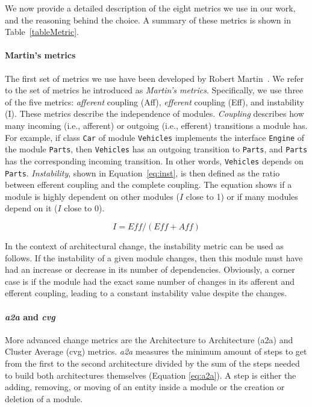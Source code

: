 \documentclass[sigplan, anonymous, review]{acmart}
\begin{document}
We now provide a detailed description of the eight metrics we use in our work, and the reasoning behind the choice.
A summary of these metrics is shown in Table~\ref{tableMetric}.


\paragraph{Martin's metrics} 
The first set of metrics we use have been developed by Robert Martin~\cite{martinsMetrics}.
We refer to the set of metrics he introduced as \textit{Martin's metrics}.
Specifically, we use three of the five metrics: \textit{afferent} coupling (Aff), \textit{efferent} coupling (Eff), and instability (I).
These metrics describe the independence of modules. 
\textit{Coupling} describes how many incoming (i.e., afferent) or outgoing (i.e., efferent) transitions a module has. 
For example, if class \texttt{Car} of module \texttt{Vehicles} implements the interface \texttt{Engine} of the module \texttt{Parts}, then \texttt{Vehicles} has an outgoing transition to \texttt{Parts}, and \texttt{Parts} has the corresponding incoming transition. 
In other words, \texttt{Vehicles} depends on \texttt{Parts}.
\textit{Instability}, shown in Equation~\ref{eq:inst}, is then defined as the ratio between efferent coupling and the complete coupling.
The equation shows if a module is highly dependent on other modules ($I$ close to 1) or if many modules depend on it ($I$ close to 0).

\begin{equation} \label{eq:inst}
I = \textit{Eff} / (\textit{Eff} + \textit{Aff})
\end{equation}

In the context of architectural change, the instability metric can be used as follows. If the instability of a given module changes, then this module must have had an increase or decrease in its number of dependencies. 
Obviously, a corner case is if the module had the exact same number of changes in its afferent and efferent coupling, leading to a constant instability value despite the changes.

\paragraph{\textit{a2a} and \textit{cvg}} More advanced change metrics are the Architecture to Architecture (a2a) and Cluster Average (cvg) metrics. 
\textit{a2a} measures the minimum amount of steps to get from the first to the second architecture divided by the sum of the steps needed to build both architectures themselves (Equation \ref{eq:a2a}). A step is either the adding, removing, or moving of an entity inside a module or the creation or deletion of a module. 
\end{document}
